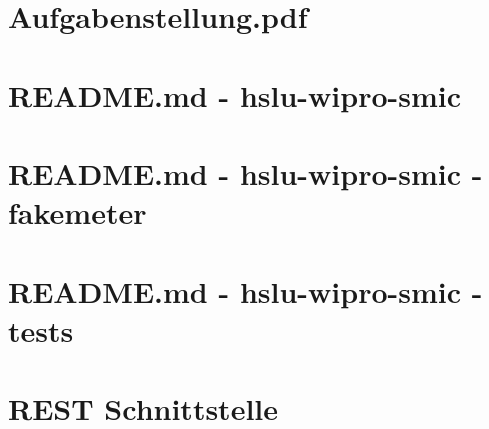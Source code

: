 \chapter{Aufgabenstellung.pdf}
\label{anhang:aufgabenstellung}


\chapter{README.md - hslu-wipro-smic}
\label{anhang:readme-main}


\chapter{README.md - hslu-wipro-smic - fakemeter}
\label{anhang:readme-fakemeter}


\chapter{README.md - hslu-wipro-smic - tests}
\label{anhang:readme-tests}


\chapter{REST Schnittstelle}
\label{anhang:smic-api}
